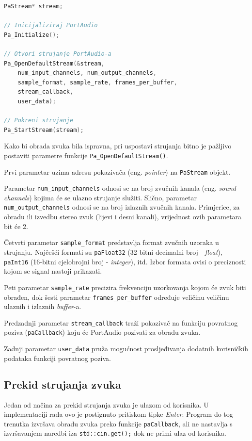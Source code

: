 \documentclass[times, utf8, diplomski, numeric]{fer}
\begin{document}
\begin{lstlisting}[language=C++, frame=single]
PaStream* stream;

// Inicijaliziraj PortAudio
Pa_Initialize();
	
// Otvori strujanje PortAudio-a
Pa_OpenDefaultStream(&stream,
	num_input_channels, num_output_channels, 
	sample_format, sample_rate, frames_per_buffer,
	stream_callback,
	user_data);
	
// Pokreni strujanje
Pa_StartStream(stream);
\end{lstlisting}

Kako bi obrada zvuka bila ispravna, pri uspostavi strujanja bitno je pažljivo postaviti parametre funkcije \verb*|Pa_OpenDefaultStream()|. 

Prvi parametar uzima adresu pokazivača (eng. \textit{pointer}) na \verb*|PaStream| objekt.  

Parametar \verb|num_input_channels| odnosi se na broj zvučnih kanala (eng. \textit{sound channels}) kojima će se ulazno strujanje služiti. Slično, parametar \verb|num_output_channels| odnosi se na broj izlaznih zvučnih kanala. Primjerice, za obradu ili izvedbu stereo zvuk (lijevi i desni kanali), vrijednost ovih parametara bit će 2.

Četvrti parametar \verb|sample_format| predstavlja format zvučnih uzoraka u strujanju. Najčešći formati su \verb|paFloat32| (32-bitni decimalni broj - \textit{float}), \verb|paInt16| (16-bitni cjelobrojni broj - \textit{integer}), itd. Izbor formata ovisi o preciznosti kojom se signal nastoji prikazati.

Peti parametar \verb|sample_rate| precizira frekvenciju uzorkovanja kojom će zvuk biti obrađen, dok šesti parametar \verb|frames_per_buffer| određuje veličinu veličinu ulaznih i izlaznih \textit{buffer}-a.

Predzadnji parametar \verb|stream_callback| traži pokazivač na funkciju povratnog poziva (\verb|paCallback|) koju će PortAudio pozivati za obradu zvuka.

Zadnji parametar \verb|user_data| pruža mogućnost prosljeđivanja dodatnih korisničkih podataka funkciji povratnog poziva.

\subsection{Prekid strujanja zvuka}

Jedan od načina za prekid strujanja zvuka je ulazom od korisnika. U implementaciji rada ovo je postignuto pritiskom tipke \textit{Enter}. Program do tog trenutka izvršava obradu zvuka preko funkcije \verb*|paCallback|, ali ne nastavlja s izvršavanjem naredbi iza \verb|std::cin.get();| dok ne primi ulaz od korisnika.
\end{document}

